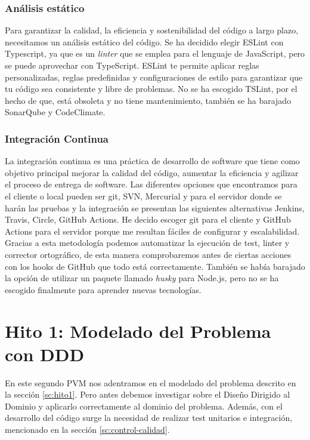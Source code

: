 \subsubsection*{Análisis estático}
Para garantizar la calidad, la eficiencia y sostenibilidad del código a largo plazo, necesitamos un análisis estático del código.
Se ha decidido elegir ESLint con Typescript, ya que es un \textit{linter} que se emplea para el lenguaje de JavaScript, pero se puede aprovechar con TypeScript.
ESLint te permite aplicar reglas personalizadas, reglas predefinidas y configuraciones de estilo para garantizar que tu código sea consistente y libre de problemas.
No se ha escogido TSLint, por el hecho de que, está obsoleta y no tiene mantenimiento, también se ha barajado SonarQube y CodeClimate.

\subsubsection*{Integración Continua}
La integración continua es una práctica de desarrollo de software que tiene como objetivo principal mejorar la calidad del código, aumentar la eficiencia y agilizar el proceso de entrega de software.
Las diferentes opciones que encontramos para el cliente o local pueden ser git, SVN, Mercurial y para el servidor donde se harán las pruebas y la integración se presentan las siguientes
alternativas Jenkins, Travis, Circle, GitHub Actions. He decido escoger git para el cliente y GitHub Actions para el servidor porque me resultan fáciles de configurar y escalabilidad.
Gracias a esta metodología podemos automatizar la ejecución de test, linter y corrector ortográfico, de esta manera comprobaremos antes de ciertas acciones con los hooks de GitHub que todo está
correctamente. También se había barajado la opción de utilizar un paquete llamado \textit{husky} para Node.js, pero no se ha escogido finalmente para aprender nuevas tecnologías.

\section{Hito 1: Modelado del Problema con DDD}

En este segundo PVM nos adentramos en el modelado del problema descrito en la sección \ref{sc:hito1}.
Pero antes debemos investigar sobre el Diseño Dirigido al Dominio y aplicarlo correctamente al dominio del problema. Además, con el desarrollo del
código surge la necesidad de realizar test unitarios e integración, mencionado en la sección \ref{sc:control-calidad}.

